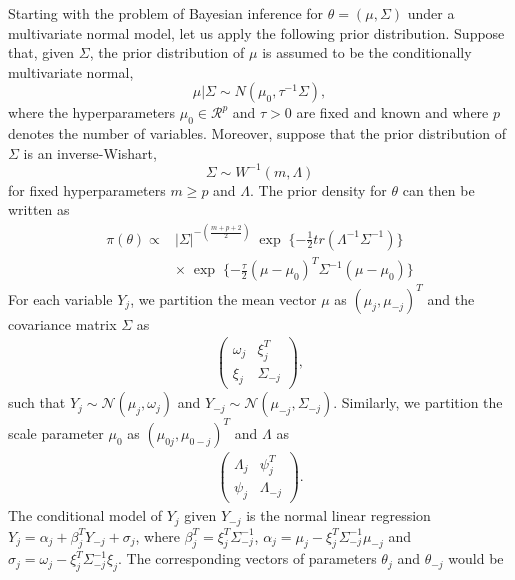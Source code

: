 	Starting with the problem of Bayesian inference for $\theta = (\mu, \Sigma)$ under a multivariate normal model, let us apply the following prior distribution. Suppose that, given $\Sigma$, the prior distribution of $\mu$ is assumed to be the conditionally multivariate normal,
	\begin{equation}
		\mu | \Sigma \sim N(\mu_{0}, \tau^{-1}\Sigma),
	\end{equation}
	where the hyperparameters $\mu_{0} \in \mathcal{R}^{p}$ and $\tau > 0$ are fixed and known and where $p$ denotes the number of variables. Moreover, suppose that the prior distribution of $\Sigma$ is an inverse-Wishart,
	\begin{equation}
		\Sigma \sim W^{-1}(m, \Lambda)
	\end{equation}
	for fixed hyperparameters $m \ge p$ and $\Lambda$. The prior density for $\theta$ can then be written as
	\begin{equation}
		\begin{array}{ll}
			\pi(\theta) \propto &|\Sigma|^{-(\frac{m+p+2}{2})}\;\exp\;\{-\frac{1}{2}tr(\Lambda^{-1}\Sigma^{-1})\}\\
			& \times\;\exp\;\{-\frac{\tau}{2}(\mu-\mu_{0})^{T}\Sigma^{-1}(\mu-\mu_{0})\}
		\end{array}	
	\end{equation}
	For each variable $Y_{j}$, we partition the mean vector $\mu$ as $(\mu_j, \mu_{-j})^T$ and the covariance matrix $\Sigma$ as 
	\begin{eqnarray*}
		\left(\begin{array}{cc}
			\omega_{j} & \xi_{j}^T\\
			\xi_{j} & \Sigma_{-j} 
		\end{array}\right),
	\end{eqnarray*}
	such that $Y_j \sim \mathcal{N}(\mu_j, \omega_{j})$ and $Y_{-j} \sim \mathcal{N}(\mu_{-j}, \Sigma_{-j})$. Similarly, we partition the scale parameter $\mu_{0}$ as $(\mu_{0j}, \mu_{0-j})^T$ and $\Lambda$ as
	\begin{eqnarray*}
		\left(\begin{array}{cc}
			\Lambda_{j} & \psi_{j}^T\\
			\psi_{j} & \Lambda_{-j} 
		\end{array}\right).
	\end{eqnarray*}
	The conditional model of $Y_j$ given $Y_{-j}$ is the normal linear regression $Y_{j} = \alpha_j + \beta_{j}^TY_{-j} + \sigma_{j}$, where $\beta_{j}^T = \xi_{j}^T\Sigma_{-j}^{-1}$, $\alpha_j = \mu_j - \xi_{j}^T\Sigma_{-j}^{-1}\mu_{-j}$ and $\sigma_{j} = \omega_{j} - \xi_{j}^T\Sigma_{-j}^{-1}\xi_{j}$. The corresponding vectors of parameters $\theta_{j}$ and $\theta_{-j}$ would be 
